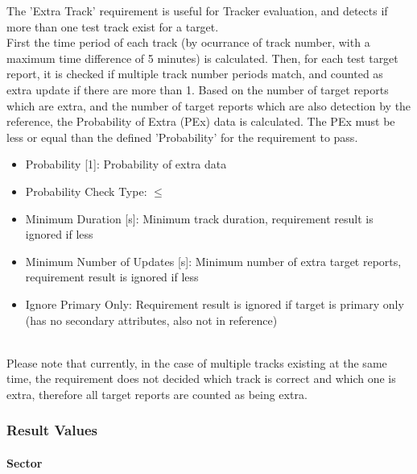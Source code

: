 The 'Extra Track' requirement is useful for Tracker evaluation, and detects if more than one test track exist for a target. \\

First the time period of each track (by ocurrance of track number, with a maximum time difference of 5 minutes) is calculated. Then, for each test target report, it is checked if multiple track number periods match, and counted as extra update if there are more than 1. Based on the number of target reports which are extra, and the number of target reports which are also detection by the reference, the Probability of Extra (PEx) data is calculated. The PEx must be less or equal than the defined 'Probability' for the requirement to pass. \\

\begin{itemize}  
\item Probability [1]: Probability of extra data
\item Probability Check Type: $\leq$
\item Minimum Duration [s]: Minimum track duration, requirement result is ignored if less
\item Minimum Number of Updates [s]: Minimum number of extra target reports, requirement result is ignored if less
\item Ignore Primary Only: Requirement result is ignored if target is primary only (has no secondary attributes, also not in reference)
\end{itemize}
\ \\

Please note that currently, in the case of multiple tracks existing at the same time, the requirement does not decided which track is correct and which one is extra, therefore all target reports are counted as being extra. \\

\subsubsection{Result Values}

\paragraph{Sector}

